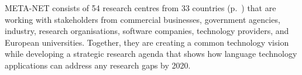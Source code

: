 \begin{Parallel}[c]{78mm}{78mm}
{META-NET consists of 54 research centres from 33 countries \cite{rehm2011} (p.~\pageref{metanetmembers}) that are working with stakeholders from commercial businesses, government agencies, industry, research organisations, software companies, technology providers, and European universities. 
Together, they are creating a common technology vision while developing a strategic research agenda that shows how language technology applications can address any research gaps by 2020.
} 
\ParallelPar
\end{Parallel}

\clearpage

\makefundingnotice




\tableofcontents



\cleardoublepage

\setcounter{page}{1}
\pagestyle{scrheadings}



